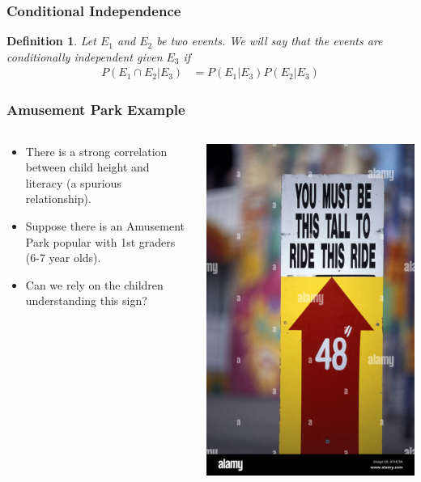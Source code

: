 \documentclass[aspectratio=169, handout]{beamer}
\newtheorem{defn}{Definition}
\numberwithin{equation}{section}
\begin{document}
\begin{frame}
\frametitle{Conditional Independence}

\begin{defn}
Let $E_{1}$ and $E_{2}$ be two events.  We will say that the events are conditionally independent given $E_{3}$ if 
\begin{align*}
P(E_{1} \cap E_{2} | E_{3}) &= P(E_{1} | E_{3} ) P(E_{2} | E_{3} ) 
\end{align*}
\end{defn}

\end{frame}

\begin{frame}
\frametitle{Amusement Park Example}
\begin{columns}
\begin{column}{0.7\textwidth}
\begin{itemize}
\item There is a strong correlation between child height and literacy (a spurious relationship).
\item Suppose there is an Amusement Park popular with 1st graders (6-7 year olds).
\item Can we rely on the children understanding this sign?
\end{itemize}
\end{column}
\begin{column}{0.3\textwidth}
\includegraphics[width=2 in]{images/carnival.jpeg}
\end{column}
\end{columns}
\end{frame}
\end{document}

